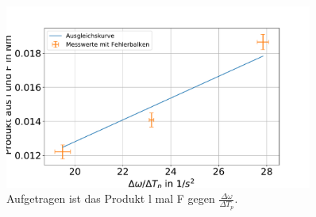 \begin{figure}[h]
	\centering
	\includegraphics[width=0.9\textwidth]{res/wtgegenlF.pdf}
	\caption{Aufgetragen ist das Produkt l mal F gegen $\frac{\Delta \omega}{\Delta T_p }$.} 
	\label{fig:Kreisel}
\end{figure}
